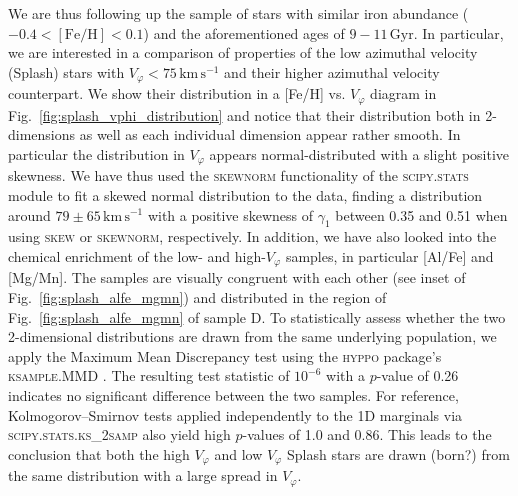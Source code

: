 \documentclass[fleqn,usenatbib]{mnras}
\begin{document}
We are thus following up the sample of stars with similar iron abundance ($-0.4 < \mathrm{[Fe/H]} < 0.1$) and the aforementioned ages of $9-11\,\mathrm{Gyr}$. In particular, we are interested in a comparison of properties of the low azimuthal velocity (Splash) stars with $V_\varphi < 75\,\mathrm{km\,s^{-1}}$ and their higher azimuthal velocity counterpart. We show their distribution in a [Fe/H] vs. $V_\varphi$ diagram in Fig.~\ref{fig:splash_vphi_distribution} and notice that their distribution both in 2-dimensions as well as each individual dimension appear rather smooth. In particular the distribution in $V_\varphi$ appears normal-distributed with a slight positive skewness. We have thus used the \textsc{skewnorm} functionality of the \textsc{scipy.stats} module \citep{Scipy} to fit a skewed normal distribution to the data, finding a distribution around $79 \pm 65\,\mathrm{km\,s^{-1}}$ with a positive skewness of $\gamma_1$ between 0.35 and 0.51 when using \textsc{skew} or \textsc{skewnorm}, respectively. In addition, we have also looked into the chemical enrichment of the low- and high-$V_\varphi$ samples, in particular [Al/Fe] and [Mg/Mn]. The samples are visually congruent with each other (see inset of Fig.~\ref{fig:splash_alfe_mgmn}) and distributed in the region of Fig.~\ref{fig:splash_alfe_mgmn} of sample D. To statistically assess whether the two 2-dimensional distributions are drawn from the same underlying population, we apply the Maximum Mean Discrepancy test \citep{Gretton2012} using the \textsc{hyppo} package's \textsc{ksample.MMD} \citep{hyppo}. The resulting test statistic of $10^{-6}$ with a $p$-value of 0.26 indicates no significant difference between the two samples. For reference, Kolmogorov–Smirnov tests \citep{Hodges1958} applied independently to the 1D marginals via \textsc{scipy.stats.ks\_2samp} also yield high $p$-values of 1.0 and 0.86. This leads to the conclusion that both the high $V_\varphi$ and low $V_\varphi$ Splash stars are drawn (born?) from the same distribution with a large spread in $V_\varphi$.
\end{document}
